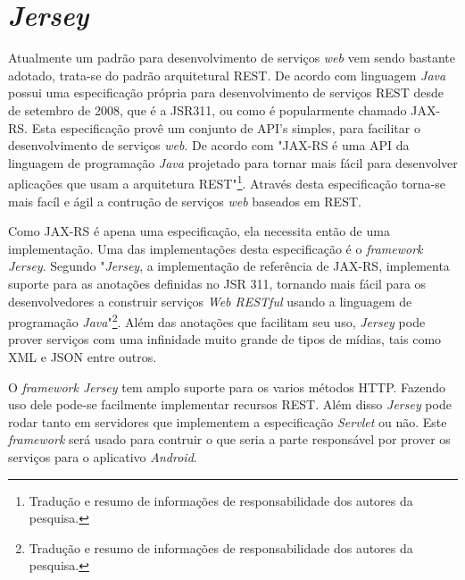 \section{\textit{Jersey}}

	\par Atualmente um padrão para desenvolvimento de serviços \textit{web} vem
sendo bastante adotado, trata-se do padrão arquitetural REST. De acordo com
 linguagem \textit{Java} possui uma especificação
própria para desenvolvimento de serviços REST desde de setembro de 2008, que é
a JSR311, ou como é popularmente chamado JAX-RS. Esta especificação provê um
conjunto de API's simples, para facilitar o desenvolvimento de serviços
\textit{web}. De acordo com  "JAX-RS é uma API da
linguagem de programação \textit{Java} projetado para tornar mais fácil para
desenvolver aplicações que usam a arquitetura REST"\footnote{Tradução e resumo
de informações de responsabilidade dos autores da pesquisa.}. Através desta
especificação torna-se mais facíl e ágil a contrução de serviços \textit{web}
baseados em REST.

	\par Como JAX-RS é apena uma especificação, ela necessita então de uma
implementação. Uma das implementações desta especificação é o
\textit{framework Jersey}. Segundo  "\textit{Jersey}, a
implementação de referência de JAX-RS, implementa suporte para as anotações
definidas no JSR 311, tornando mais fácil para os desenvolvedores a construir
serviços \textit{Web RESTful} usando a linguagem de programação
\textit{Java}"\footnote{Tradução e resumo de informações de responsabilidade
dos autores da pesquisa.}. Além das anotações que facilitam seu uso,
\textit{Jersey} pode prover serviços com uma infinidade muito grande de tipos de
mídias, tais como XML e JSON entre outros.

	\par O \textit{framework Jersey} tem amplo suporte para os varios métodos HTTP.
Fazendo uso dele pode-se facilmente implementar recursos REST. Além disso
\textit{Jersey}  pode rodar tanto em servidores que implementem a especificação
\textit{Servlet} ou não. Este \textit{framework} será usado para contruir o que
seria a parte responsável por prover os serviços para o aplicativo
\textit{Android}.